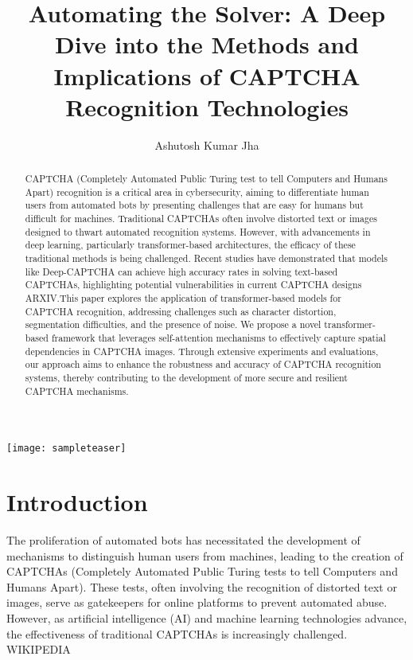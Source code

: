 \documentclass[sigconf]{acmart}
\begin{document}
\title{Automating the Solver: A Deep Dive into the Methods and Implications of CAPTCHA Recognition Technologies}

\author{Ashutosh Kumar Jha}

\begin{abstract}
CAPTCHA (Completely Automated Public Turing test to tell Computers and Humans Apart) recognition is a critical area in cybersecurity, aiming to differentiate human users from automated bots by presenting challenges that are easy for humans but difficult for machines. Traditional CAPTCHAs often involve distorted text or images designed to thwart automated recognition systems. However, with advancements in deep learning, particularly transformer-based architectures, the efficacy of these traditional methods is being challenged. Recent studies have demonstrated that models like Deep-CAPTCHA can achieve high accuracy rates in solving text-based CAPTCHAs, highlighting potential vulnerabilities in current CAPTCHA designs 
ARXIV.This paper explores the application of transformer-based models for CAPTCHA recognition, addressing challenges such as character distortion, segmentation difficulties, and the presence of noise. We propose a novel transformer-based framework that leverages self-attention mechanisms to effectively capture spatial dependencies in CAPTCHA images. Through extensive experiments and evaluations, our approach aims to enhance the robustness and accuracy of CAPTCHA recognition systems, thereby contributing to the development of more secure and resilient CAPTCHA mechanisms.
\end{abstract}


\begin{teaserfigure}
  \texttt{[image: sampleteaser]}
  \label{fig:teaser}
\end{teaserfigure}



\maketitle

\section{Introduction}
The proliferation of automated bots has necessitated the development of mechanisms to distinguish human users from machines, leading to the creation of CAPTCHAs (Completely Automated Public Turing tests to tell Computers and Humans Apart). These tests, often involving the recognition of distorted text or images, serve as gatekeepers for online platforms to prevent automated abuse. However, as artificial intelligence (AI) and machine learning technologies advance, the effectiveness of traditional CAPTCHAs is increasingly challenged. 
WIKIPEDIA
\end{document}
